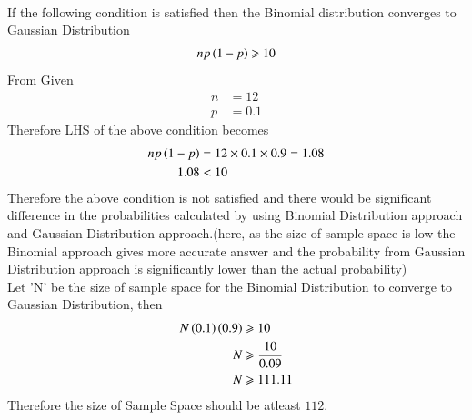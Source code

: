 \documentclass[journal,12pt,twocolumn]{IEEEtran}
\begin{document}
\begin{enumerate}[label=(\Roman*), align=left]
\\If the following condition is satisfied then the Binomial distribution converges to Gaussian Distribution
 \begin{align}
    np\left(1-p\right)\geqslant 10
    \end{align}
From Given
 \begin{align}
    n&=12\nonumber\\
    p&=0.1\nonumber
    \end{align}
Therefore LHS of the above condition becomes
 \begin{align}
    np\left(1-p\right)&=12\times0.1\times0.9=1.08\nonumber\\
    1.08 &< 10\nonumber
    \end{align}
Therefore the above condition is not satisfied and there would be significant difference in the probabilities calculated by using Binomial Distribution approach and Gaussian Distribution approach.(here, as the size of sample space is low the Binomial approach gives more accurate answer and the probability from Gaussian Distribution approach is significantly lower than the actual probability)
\\Let 'N' be the size of sample space for the Binomial Distribution to converge to Gaussian Distribution, then
\begin{align}
    N\left(0.1\right)\left(0.9\right)&\geqslant 10\nonumber\\
    N&\geqslant \frac{10}{0.09}\nonumber\\
    N&\geqslant 111.11
    \end{align}
Therefore the size of Sample Space should be atleast $112$.
\end{enumerate}
\end{document}
